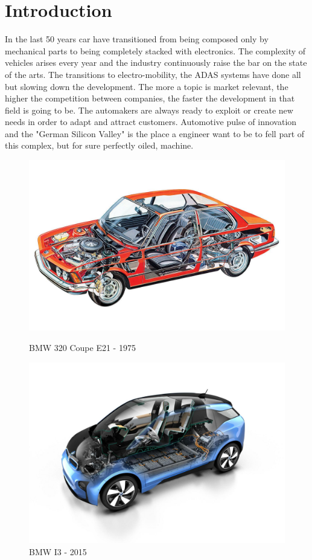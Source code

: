\documentclass[../main.tex]{subfiles}
\begin{document}
\section{Introduction}
In the last 50 years car have transitioned from being composed only by mechanical parts to being completely stacked with electronics. The complexity of vehicles arises every year and the industry continuously raise the bar on the state of the arts. The transitions to electro-mobility, the ADAS systems have done all but slowing down the development. The more a topic is market relevant, the higher the competition between companies, the faster the development in that field is going to be. The automakers are always ready to exploit or create new needs in order to adapt and attract customers. Automotive pulse of innovation and the "German Silicon Valley" is the place a engineer want to be to fell part of this complex, but for sure perfectly oiled, machine.   
\begin{figure}
\centering
\begin{minipage}{.5\textwidth}
  \centering
  \includegraphics[width=\linewidth]{images_folder/4a56e1d50b56da42a10e29d451cf2b93.jpg}
  \caption{BMW 320 Coupe E21 - 1975}
  \label{fig:test1}
\end{minipage}%
\begin{minipage}{.5\textwidth}
  \centering
  \includegraphics[width=\linewidth]{images_folder/BMW_i3.jpg}
  \caption{BMW I3 - 2015}
  \label{fig:test2}
\end{minipage}
\end{figure}
\end{document}
